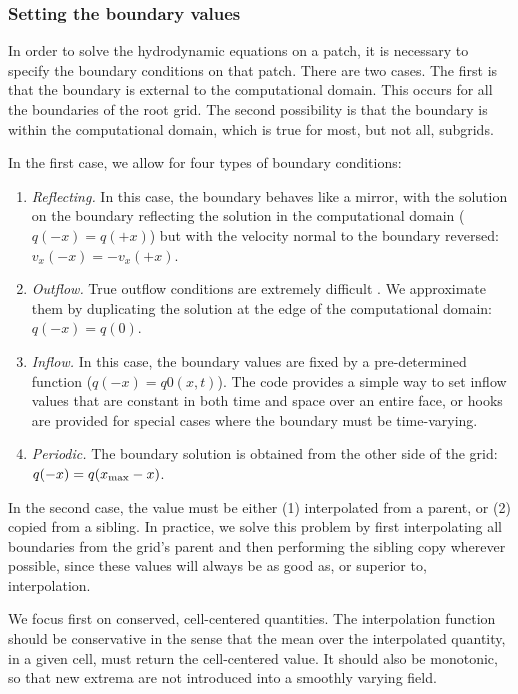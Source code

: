 \subsubsection{Setting the boundary values}
\label{sec:interpolation}

In order to solve the hydrodynamic equations on a patch, it is necessary to specify the boundary conditions on that patch.  There are two cases.  The first is that the boundary is external to the computational domain.  This occurs for all the boundaries of the root grid.  The second possibility is that the boundary is within the computational domain, which is true for most, but not all, subgrids.

In the first case, we allow for four types of boundary conditions:
\begin{enumerate}
  \item{\em Reflecting.} In this case, the boundary behaves like a mirror, with the solution on the boundary reflecting the solution in the computational domain ($q(-x) = q(+x)$) but with the velocity normal to the boundary reversed: $v_x(-x) = -v_x(+x)$.
  \item{\em Outflow.} True outflow conditions are extremely difficult .  We approximate them by duplicating the solution at the edge of the computational domain: $q(-x) = q(0)$.
  \item{\em Inflow.} In this case, the boundary values are fixed by a pre-determined function ($q(-x) = q0(x,t)$).  The code provides a simple way to set inflow values that are constant in both time and space over an entire face, or hooks are provided for special cases where the boundary must be time-varying.
  \item{\em Periodic.} The boundary solution is obtained from the other side of the grid: $q(-x) = q(x_{\rm{max}}-x)$.
\end{enumerate}

In the second case, the value must be either (1) interpolated from a parent, or (2) copied from a sibling.  In practice, we solve this problem by first interpolating all boundaries from the grid's parent and then performing the sibling copy wherever possible, since these values will always be as good as, or superior to, interpolation.

We focus first on conserved, cell-centered quantities.  The interpolation function should be conservative in the sense that the mean over the interpolated quantity, in a given cell, must return the cell-centered value.  It should also be monotonic, so that new extrema are not introduced into a smoothly varying field.

